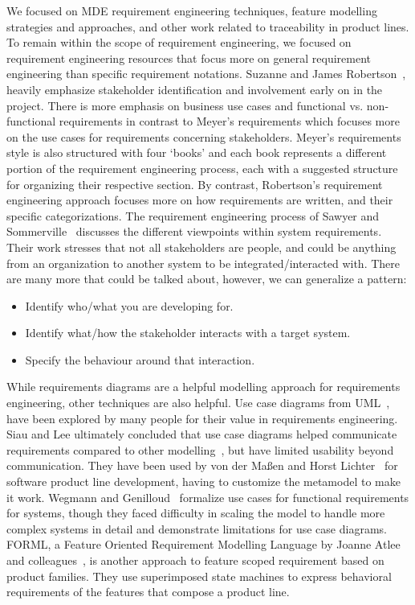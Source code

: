 We focused on MDE requirement engineering techniques, feature modelling strategies and approaches, and other work related to traceability in product lines. To remain within the scope of requirement engineering, we focused on requirement engineering resources that focus more on general requirement engineering than specific requirement notations. Suzanne and James Robertson~\cite{robertson2012mastering, robertson2000volere}, heavily emphasize stakeholder identification and involvement early on in the project. There is more emphasis on business use cases and functional vs. non-functional requirements in contrast to Meyer's requirements which focuses more on the use cases for requirements concerning stakeholders. Meyer's requirements style is also structured with four `books' and each book represents a different portion of the requirement engineering process, each with a suggested structure for organizing their respective section. By contrast, Robertson's requirement engineering approach focuses more on how requirements are written, and their specific categorizations. The requirement engineering process of Sawyer and Sommerville~\cite{sommerville1997requirements, sommerville1997viewpoints} discusses the different viewpoints within system requirements. Their work stresses that not all stakeholders are people, and could be anything from an organization to another system to be integrated/interacted with. There are many more that could be talked about, however, we can generalize a pattern:
\begin{itemize}
	\item Identify who/what you are developing for.
	\item Identify what/how the stakeholder interacts with a target system.
	\item Specify the behaviour around that interaction.
\end{itemize}

While requirements diagrams are a helpful modelling approach for requirements engineering, other techniques are also helpful. Use case diagrams from UML~\cite{fowler2018uml}, have been explored by many people for their value in requirements engineering. Siau and Lee ultimately concluded that use case diagrams helped communicate requirements compared to other modelling~\cite{siau2004use}, but have limited usability beyond communication. They have been used by von der Ma{\ss}en and Horst Lichter~\cite{von2002modeling} for software product line development, having to customize the metamodel to make it work. Wegmann and Genilloud~\cite{wegmann2000role} formalize use cases for functional requirements for systems, though they faced difficulty in scaling the model to handle more complex systems in detail and demonstrate limitations for use case diagrams. FORML, a Feature Oriented Requirement Modelling Language by Joanne Atlee and colleagues~\cite{Beidu2019, 6345799}, is another approach to feature scoped requirement based on product families. They use superimposed state machines to express behavioral requirements of the features that compose a product line.


